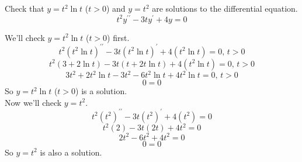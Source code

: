 \begin{example}
	Check that $y = t^2\ln{t}$ ($t > 0$) and $y = t^2$  are solutions to the differential equation.
	\begin{equation*}
		t^2y^{\prime\prime} - 3ty^\prime + 4y = 0
	\end{equation*}
\end{example}
\noindent
We'll check $y= t^2\ln{t}$ ($t > 0$) first.
\begin{equation*}
	t^2\left(t^2\ln{t}\right)^{\prime\prime} - 3t\left(t^2\ln{t}\right)^\prime + 4\left(t^2\ln{t}\right) = 0 \text{, } t > 0
\end{equation*}
\begin{equation*}
	t^2\left(3 + 2\ln{t}\right) - 3t\left(t + 2t\ln{t}\right) + 4\left(t^2\ln{t}\right) = 0 \text{, } t > 0
\end{equation*}
\begin{equation*}
	3t^2 + 2t^2\ln{t} - 3t^2 - 6t^2\ln{t} + 4t^2\ln{t} = 0 \text{, } t > 0
\end{equation*}
\begin{equation*}
	0 = 0
\end{equation*}
So $y = t^2\ln{t}$ ($t > 0$) is a solution.\\
Now we'll check $y= t^2$.
\begin{equation*}
	t^2\left(t^2\right)^{\prime\prime} - 3t\left(t^2\right)^\prime + 4\left(t^2\right) = 0
\end{equation*}
\begin{equation*}
	t^2\left(2\right) - 3t\left(2t\right) + 4t^2 = 0
\end{equation*}
\begin{equation*}
	2t^2 - 6t^2 + 4t^2 = 0
\end{equation*}
\begin{equation*}
	0 = 0
\end{equation*}
So $y = t^2$ is also a solution.